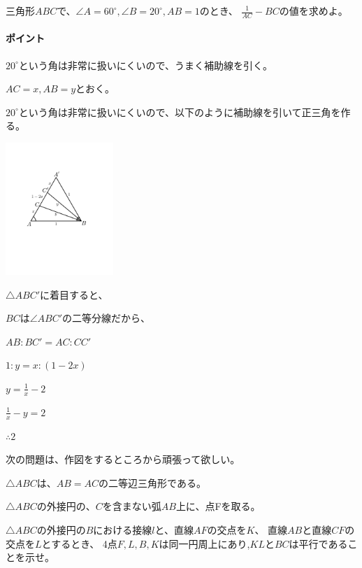 \documentclass[uplatex,dvipdfmx]{jsbook}
\begin{document}
\begin{problem}[練習問題2]
    三角形$ABC$で、$\angle A=60^\circ,\angle B=20^\circ,AB=1$のとき、
    $\displaystyle\frac{1}{AC}-BC$の値を求めよ。
\end{problem}

\paragraph{ポイント} $20^\circ$という角は非常に扱いにくいので、うまく補助線を引く。

\begin{answer}
    $AC=x,AB=y$とおく。

    $20^\circ$という角は非常に扱いにくいので、以下のように補助線を引いて正三角を作る。

    \includegraphics[clip,height=5cm]{figures/practice2.pdf}

    $\triangle ABC'$に着目すると、

    $BC$は$\angle ABC'$の二等分線だから、

    $AB:BC'=AC:CC'$

    $1:y=x:(1-2x)$

    $\displaystyle y = \frac{1}{x}-2$

    $\frac{1}{x}-y=2$

    $\therefore 2$
\end{answer}

次の問題は、作図をするところから頑張って欲しい。

\begin{problem}[練習問題3]
    $\triangle ABC$は、$AB=AC$の二等辺三角形である。

    $\triangle ABC$の外接円の、$C$を含まない弧$AB$上に、点Fを取る。

    $\triangle ABC$の外接円の$B$における接線$l$と、直線$AF$の交点を$K$、
    直線$AB$と直線$CF$の交点を$L$とするとき、
    4点$F,L,B,K$は同一円周上にあり,$KL$と$BC$は平行であることを示せ。
\end{problem}
\end{document}
